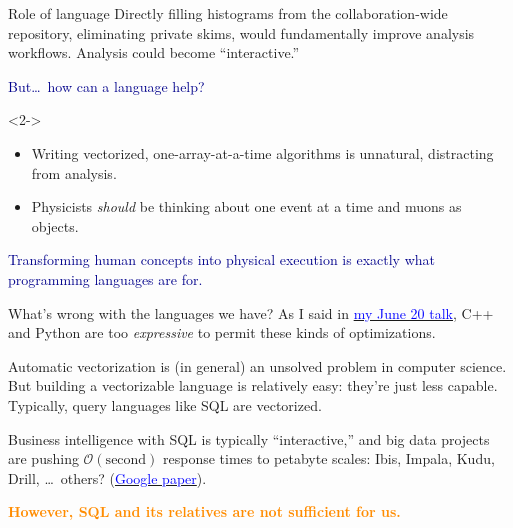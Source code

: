 \documentclass{beamer}
\begin{document}
\begin{frame}{Role of language}
\vspace{0.5 cm}
Directly filling histograms from the collaboration-wide repository, eliminating private skims, would fundamentally improve analysis workflows. Analysis could become ``interactive.''

\vspace{0.5 cm}
\textcolor{darkblue}{But\ldots\ how can a language help?}

\begin{uncoverenv}<2->
\vspace{0.3 cm}
\begin{itemize}
\item Writing vectorized, one-array-at-a-time algorithms is unnatural, distracting from analysis.
\item Physicists {\it should} be thinking about one event at a time and muons as objects.
\end{itemize}

\vspace{0.3 cm}
\textcolor{darkblue}{Transforming human concepts into physical execution is exactly what programming languages are for.}
\end{uncoverenv}
\end{frame}

\begin{frame}{What's wrong with the languages we have?}
\vspace{0.25 cm}
As I said in \href{https://indico.cern.ch/event/544650/}{\textcolor{blue}{my June 20 talk}}, C++ and Python are too {\it expressive} to permit these kinds of optimizations.

\vspace{0.5 cm}
Automatic vectorization is (in general) an unsolved problem in computer science. But building a vectorizable language is relatively easy: they're just less capable. Typically, query languages like SQL are vectorized.

\vspace{0.5 cm}
Business intelligence with SQL is typically ``interactive,'' and big data projects are pushing $\mathcal{O}(\mbox{second})$ response times to petabyte scales: Ibis, Impala, Kudu, Drill, \ldots\ others? (\href{http://research.google.com/pubs/pub36632.html}{\textcolor{blue}{Google paper}}).

\vspace{0.5 cm}
\textcolor{darkorange}{\bf However, SQL and its relatives are not sufficient for us.}
\end{frame}
\end{document}
